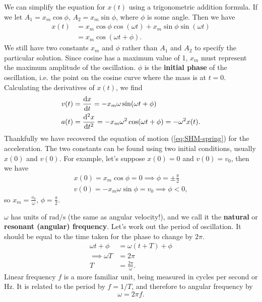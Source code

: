 \documentclass[../classical_mechanics.tex]{subfiles}
\begin{document}
        We can simplify the equation for $x(t)$ using a trigonometric addition formula.
        If we let $A_1=x_m\cos\phi$, $A_2=x_m\sin\phi$, where $\phi$ is some angle.
        Then we have
        \begin{align}
            x(t)&=x_m\cos\phi\cos(\omega t)+x_m\sin\phi\sin(\omega t)\\
            &=x_m\cos(\omega t+\phi)\label{eq:SHM-displacement}.
        \end{align}
        We still have two constants $x_m$ and $\phi$ rather than $A_1$ and $A_2$ to specify the particular solution.
        Since cosine has a maximum value of 1, $x_m$ must represent the maximum amplitude of the oscillation.
        $\phi$ is the \textbf{initial phase} of the oscillation, i.e. the point on the cosine curve where the mass is at $t=0$.
        Calculating the derivatives of $x(t)$, we find
        \begin{align}
            v(t)&=\dv{x}{t}=-x_m\omega\sin(\omega t+\phi)\label{eq:SHM-velocity}\\
            a(t)&=\dv[2]{x}{t}=-x_m\omega^2\cos(\omega t+\phi)=-\omega^2x(t)\label{eq:SHM-acceleration}.
        \end{align}
        Thankfully we have recovered the equation of motion (\ref{eq:SHM-spring}) for the acceleration.
        The two constants can be found using two initial conditions, usually $x(0)$ and $v(0)$.
        For example, let's suppose $x(0)=0$ and $v(0)=v_0$, then we have
        \begin{align}
            x(0)=x_m\cos\phi=0\implies\phi=\pm\frac{\pi}{2}\\
            v(0)=-x_m\omega\sin\phi=v_0\implies\phi<0,
        \end{align}
        so $x_m=\frac{v_0}{\omega}$, $\phi=\frac{\pi}{2}$.

        $\omega$ has units of $\unit{\radian\per\second}$ (the same as angular velocity!), and we call it the \textbf{natural} or \textbf{resonant (angular) frequency}.
        Let's work out the period of oscillation.
        It should be equal to the time taken for the phase to change by $2\pi$.
        \begin{align}
            \omega t+\phi&=\omega(t+T)+\phi\\
            \implies\omega T&=2\pi\\
            T&=\frac{2\pi}{\omega}.
        \end{align}
        Linear frequency $f$ is a more familiar unit, being measured in cycles per second or \unit{\hertz}.
        It is related to the period by $f=1/T$, and therefore to angular frequency by
        \begin{equation}
            \omega=2\pi f.
        \end{equation}
\end{document}
